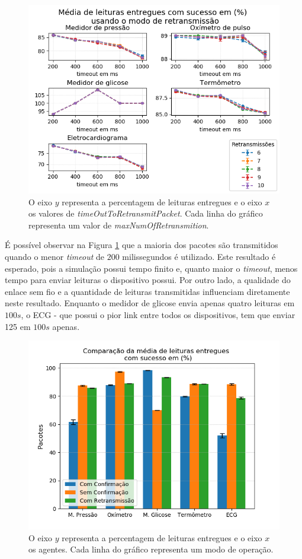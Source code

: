 \begin{figure}[htbp]
\centering
\includegraphics[width=.7\textwidth]{figures/mediaDeLeiturasEntregues.png}
\caption{O eixo $y$ representa a percentagem de leituras entregues e o eixo $x$ os valores de  \textit{timeOutToRetransmitPacket}. Cada linha do gráfico representa um valor de \textit{maxNumOfRetransmition}.}
\label{fig:leiturasEntregues} 
\end{figure}

É possível observar na Figura \ref{fig:leiturasEntregues} que a maioria dos pacotes são transmitidos quando o menor \textit{timeout} de $200$ milissegundos é utilizado. Este resultado é esperado, pois a simulação possui tempo finito e, quanto maior o \textit{timeout}, menos tempo para enviar leituras o dispositivo possui. Por outro lado, a qualidade do enlace sem fio e a quantidade de leituras transmitidas influenciam diretamente neste resultado. Enquanto o medidor de glicose envia apenas quatro leituras em $100s$, o ECG - que possui o pior link entre todos os dispositivos, tem que enviar 125 em $100s$ apenas.

\begin{figure}[H]
\centering
\includegraphics[width=.6\textwidth]{figures/mediaDeLeiturasEntregues2modes.png}
\caption{O eixo $y$ representa a percentagem de leituras entregues e o eixo $x$ os agentes. Cada linha do gráfico representa um modo de operação.}
\label{fig:leiturasEntregues2modes}
\end{figure}


